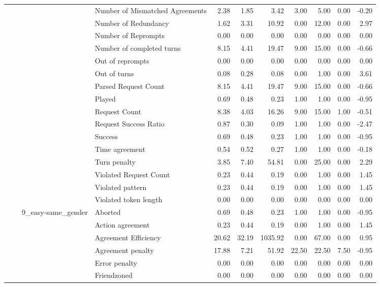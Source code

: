\begin{tabular}{llllrrrrrrr}
 &  &  & Number of Mismatched Agreements & 2.38 & 1.85 & 3.42 & 3.00 & 5.00 & 0.00 & -0.20 \\
 &  &  & Number of Redundancy & 1.62 & 3.31 & 10.92 & 0.00 & 12.00 & 0.00 & 2.97 \\
 &  &  & Number of Reprompts & 0.00 & 0.00 & 0.00 & 0.00 & 0.00 & 0.00 & 0.00 \\
 &  &  & Number of completed turns & 8.15 & 4.41 & 19.47 & 9.00 & 15.00 & 0.00 & -0.66 \\
 &  &  & Out of reprompts & 0.00 & 0.00 & 0.00 & 0.00 & 0.00 & 0.00 & 0.00 \\
 &  &  & Out of turns & 0.08 & 0.28 & 0.08 & 0.00 & 1.00 & 0.00 & 3.61 \\
 &  &  & Parsed Request Count & 8.15 & 4.41 & 19.47 & 9.00 & 15.00 & 0.00 & -0.66 \\
 &  &  & Played & 0.69 & 0.48 & 0.23 & 1.00 & 1.00 & 0.00 & -0.95 \\
 &  &  & Request Count & 8.38 & 4.03 & 16.26 & 9.00 & 15.00 & 1.00 & -0.51 \\
 &  &  & Request Success Ratio & 0.87 & 0.30 & 0.09 & 1.00 & 1.00 & 0.00 & -2.47 \\
 &  &  & Success & 0.69 & 0.48 & 0.23 & 1.00 & 1.00 & 0.00 & -0.95 \\
 &  &  & Time agreement & 0.54 & 0.52 & 0.27 & 1.00 & 1.00 & 0.00 & -0.18 \\
 &  &  & Turn penalty & 3.85 & 7.40 & 54.81 & 0.00 & 25.00 & 0.00 & 2.29 \\
 &  &  & Violated Request Count & 0.23 & 0.44 & 0.19 & 0.00 & 1.00 & 0.00 & 1.45 \\
 &  &  & Violated pattern & 0.23 & 0.44 & 0.19 & 0.00 & 1.00 & 0.00 & 1.45 \\
 &  &  & Violated token length & 0.00 & 0.00 & 0.00 & 0.00 & 0.00 & 0.00 & 0.00 \\
\cline{3-11}
 &  & \multirow[t]{27}{*}{9_easy-same_gender} & Aborted & 0.69 & 0.48 & 0.23 & 1.00 & 1.00 & 0.00 & -0.95 \\
 &  &  & Action agreement & 0.23 & 0.44 & 0.19 & 0.00 & 1.00 & 0.00 & 1.45 \\
 &  &  & Agreement Efficiency & 20.62 & 32.19 & 1035.92 & 0.00 & 67.00 & 0.00 & 0.95 \\
 &  &  & Agreement penalty & 17.88 & 7.21 & 51.92 & 22.50 & 22.50 & 7.50 & -0.95 \\
 &  &  & Error penalty & 0.00 & 0.00 & 0.00 & 0.00 & 0.00 & 0.00 & 0.00 \\
 &  &  & Friendzoned & 0.00 & 0.00 & 0.00 & 0.00 & 0.00 & 0.00 & 0.00 \\

\end{tabular}
